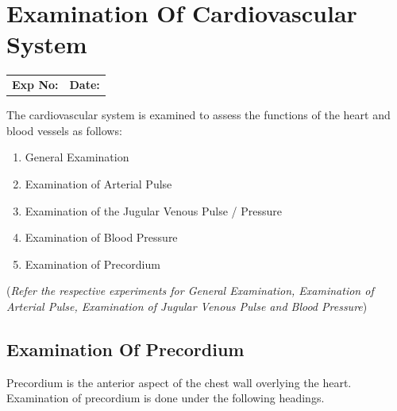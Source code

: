 \documentclass[a4paper,12pt,openany,twoside]{book}
\begin{document}
															\chapter*{\centering Examination Of Cardiovascular System}
															\begin{tabular}{p{5in} p{1in}}
																\textbf{Exp No:}  & \textbf{Date:}\\
															\end{tabular}
															\par
The cardiovascular system is examined to assess the functions of the heart and blood vessels as follows:
\begin{enumerate}
\item{General Examination}
\item{Examination of Arterial Pulse}
\item{Examination of the Jugular Venous Pulse / Pressure}
\item{Examination of Blood Pressure}
\item{Examination of Precordium}
\end{enumerate}

(\emph{Refer the respective experiments for General Examination, Examination of Arterial Pulse, Examination of Jugular Venous Pulse and Blood Pressure})

\section*{Examination Of Precordium}
\par
Precordium is the anterior aspect of the chest wall overlying the heart. Examination of precordium is done under the following headings.
\end{document}
